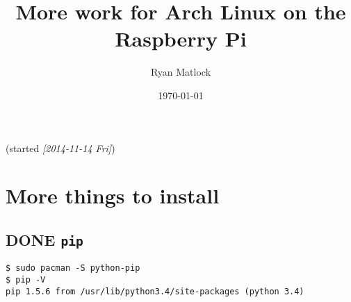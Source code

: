 \documentclass[11pt]{article}
\author{Ryan Matlock}
\date{\today}
\title{More work for Arch Linux on the Raspberry Pi}
\begin{document}
\maketitle
\tableofcontents

(started \textit{[2014-11-14 Fri]})

\section{More things to install}
\label{sec-1}

\subsection{{\bfseries\sffamily DONE} \texttt{pip}}
\label{sec-1-1}
\begin{verbatim}
$ sudo pacman -S python-pip
$ pip -V
pip 1.5.6 from /usr/lib/python3.4/site-packages (python 3.4)
\end{verbatim}
\end{document}
